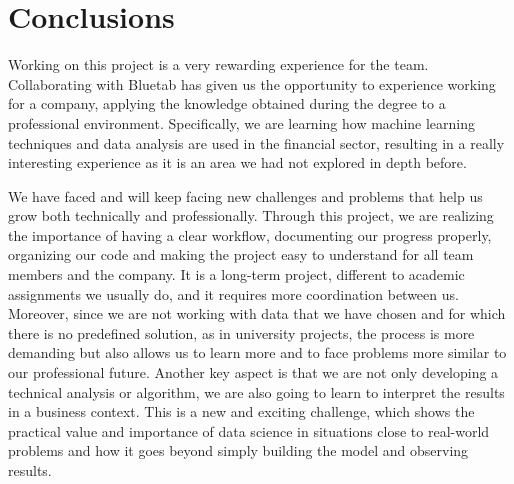 \documentclass[12pt]{report} %
\begin{document}



    

\chapter{Conclusions}

Working on this project is a very rewarding experience for the team. Collaborating with Bluetab has given us the opportunity to experience working for a company, applying the knowledge obtained during the degree to a professional environment. Specifically, we are learning how machine learning techniques and data analysis are used in the financial sector, resulting in a really interesting experience as it is an area we had not explored in depth before.

We have faced and will keep facing new challenges and problems that help us grow both technically and professionally. Through this project, we are realizing the importance of having a clear workflow, documenting our progress properly, organizing our code and making the project easy to understand for all team members and the company. It is a long-term project, different to academic assignments we usually do, and it requires more coordination between us. Moreover, since we are not working with data that we have chosen and for which there is no predefined solution, as in university projects, the process is more demanding but also allows us to learn more and to face problems more similar to our professional future. Another key aspect is that we are not only developing a technical analysis or algorithm, we are also going to learn to interpret the results in a business context. This is a new and exciting challenge, which shows the practical value  and importance of data science in situations close to real-world problems and how it goes beyond simply building the model and observing results.
\end{document}

